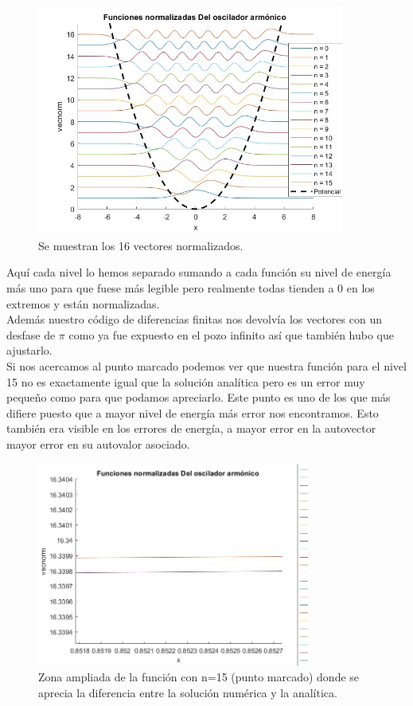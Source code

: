 \documentclass[12pt]{article}
\begin{document}
    \begin{figure}[H]
        \centering
        \includegraphics[width=0.9\textwidth]{fotos/16funcionesoscilador.jpg}
        \caption{Se muestran los 16 vectores normalizados.}
    \end{figure}
    
    Aquí cada nivel lo hemos separado sumando a cada función su nivel de energía más uno para que fuese más legible pero realmente todas tienden a 0 en los extremos y están normalizadas.\\
    
    Además nuestro código de diferencias finitas nos devolvía los vectores con un desfase de $\pi$ como ya fue expuesto en el pozo infinito así que también hubo que ajustarlo. \\
    
    Si nos acercamos al punto marcado podemos ver que nuestra función para el nivel 15 no es exactamente igual que la solución analítica pero es un error muy pequeño como para que podamos apreciarlo. Este punto es uno de los que más difiere puesto que a mayor nivel de energía más error nos encontramos. Esto también era visible en los errores de energía, a mayor error en la autovector mayor error en su autovalor asociado.
    
    \begin{figure}[H]
        \centering
        \includegraphics[width=0.8\textwidth]{fotos/diferenciaentrefunciones.jpg}
        \caption{Zona ampliada de la función con n=15 (punto marcado) donde se aprecia la diferencia entre la solución numérica y la analítica.}
    \end{figure}
\end{document}
